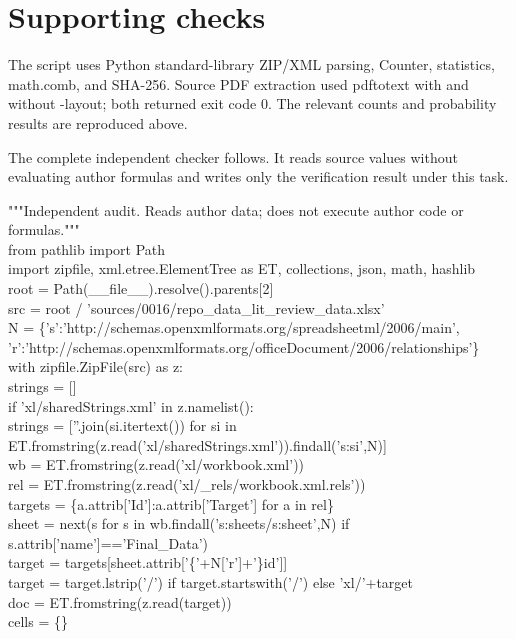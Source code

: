 \documentclass[10pt]{article}
\begin{document}
\section*{Supporting checks}
The script uses Python standard-library ZIP/XML parsing, Counter, statistics, math.comb, and SHA-256. Source PDF extraction used pdftotext with and without -layout; both returned exit code 0. The relevant counts and probability results are reproduced above.\par
The complete independent checker follows. It reads source values without evaluating author formulas and writes only the verification result under this task.\par
{\ttfamily\footnotesize """Independent audit. Reads author data; does not execute author code or formulas."""\\
from pathlib import Path\\
import zipfile, xml.etree.ElementTree as ET, collections, json, math, hashlib\\
root = Path(\_\_file\_\_).resolve().parents[2]\\
src = root / 'sources/0016/repo\_data\_lit\_review\_data.xlsx'\\
N = \{'s':'http://schemas.openxmlformats.org/spreadsheetml/2006/main',\\
     'r':'http://schemas.openxmlformats.org/officeDocument/2006/relationships'\}\\
with zipfile.ZipFile(src) as z:\\
    strings = []\\
    if 'xl/sharedStrings.xml' in z.namelist():\\
        strings = [''.join(si.itertext()) for si in ET.fromstring(z.read('xl/sharedStrings.xml')).findall('s:si',N)]\\
    wb = ET.fromstring(z.read('xl/workbook.xml'))\\
    rel = ET.fromstring(z.read('xl/\_rels/workbook.xml.rels'))\\
    targets = \{a.attrib['Id']:a.attrib['Target'] for a in rel\}\\
    sheet = next(s for s in wb.findall('s:sheets/s:sheet',N) if s.attrib['name']=='Final\_Data')\\
    target = targets[sheet.attrib['\{'+N['r']+'\}id']]\\
    target = target.lstrip('/') if target.startswith('/') else 'xl/'+target\\
    doc = ET.fromstring(z.read(target))\\
    cells = \{\}\\
}
\end{document}
